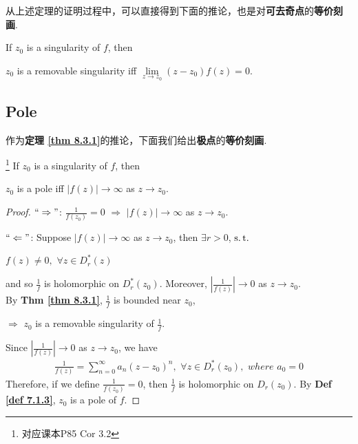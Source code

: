 	\vspace{3em}
	从上述定理的证明过程中，可以直接得到下面的推论，也是对\textbf{可去奇点}的\textbf{等价刻画}.
	\begin{corollary}\label{cor 8.3.2}
		If $z_0$ is a singularity of $f$, then
		\begin{center}
			$z_0$ is a removable singularity \hspace*{1em} iff \hspace*{1em} $\underset{z \to z_0}{\lim}{(z - z_0)f(z)} = 0$.
		\end{center}
	\end{corollary}

\newpage
\subsection{\textbf{Pole}}
	作为\textbf{定理 \ref{thm 8.3.1}}的推论，下面我们给出\textbf{极点}的\textbf{等价刻画}.
	\begin{corollary}\label{cor 8.3.3}\footnote{对应课本P85 Cor 3.2}
		If $z_0$ is a singularity of $f$, then
		\begin{center}
			$z_0$ is a pole \hspace*{1em} iff \hspace*{1em} $\left| f(z) \right| \to \infty$ as $z \to z_0$.
		\end{center}
	
		\vspace{2em}
		\begin{proof}
			$`` \Rightarrow "$: $\frac{1}{f(z_0)} = 0 \,\, \Rightarrow \,\, \left| f(z) \right| \to \infty$ as $z \to z_0$. 
			
			\vspace{1em}
			$`` \Leftarrow "$: Suppose $\left| f(z) \right| \to \infty$ as $z \to z_0$, then $\exists r > 0$, $\operatorname{s.t.}$
			\begin{center}
				$f(z) \neq 0 , \,\, \forall z \in D_{r}^{*}(z)$
			\end{center}
			and so $\frac{1}{f}$ is holomorphic on $D_{r}^{*}(z_0)$. Moreover, $\left| \frac{1}{f(z)} \right| \to 0$ as $z \to z_0$. \\
			By \textbf{Thm \ref{thm 8.3.1}}, $\frac{1}{f}$ is bounded near $z_0$,
			\begin{center}
				$\Rightarrow \,\, z_0$ is a removable singularity of $\frac{1}{f}$.
			\end{center}
			Since $\left| \frac{1}{f(z)} \right| \to 0$ as $z \to z_0$, we have
			\begin{align}
				\frac{1}{f(z)} = \sum_{n = 0}^{\infty}{a_n (z - z_0)^n} , \,\, \forall z \in D_{r}^{*}(z_0) , \,\, where \,\, a_0 = 0
			\end{align}
			Therefore, if we define $\frac{1}{f(z_0)} = 0$, then $\frac{1}{f}$ is holomorphic on $D_{r}(z_0)$. By \textbf{Def \ref{def 7.1.3}}, $z_0$ is a pole of $f$. 
		\end{proof}
	\end{corollary}

